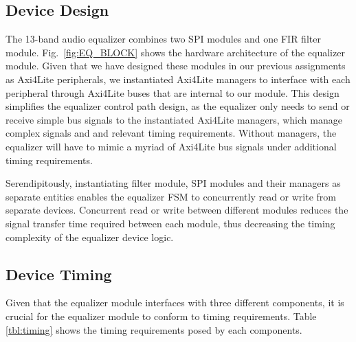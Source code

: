 \documentclass[journal]{IEEEtran} %
\begin{document}
\subsection{Device Design}\label{subsec:dev_design}
The 13-band audio equalizer combines two SPI modules and one FIR filter module. Fig.~\ref{fig:EQ_BLOCK} shows the hardware architecture of the equalizer module. Given that we have designed these modules in our previous assignments as Axi4Lite peripherals, we instantiated Axi4Lite managers to interface with each peripheral through Axi4Lite buses that are internal to our module. This design simplifies the equalizer control path design, as the equalizer only needs to send or receive simple bus signals to the instantiated Axi4Lite managers, which manage complex signals and and relevant timing requirements. Without managers, the equalizer will have to mimic a myriad of Axi4Lite bus signals under additional timing requirements. 

Serendipitously, instantiating filter module, SPI modules and their managers as separate entities enables the equalizer FSM to concurrently read or write from separate devices. Concurrent read or write between different modules reduces the signal transfer time required between each module, thus decreasing the timing complexity of the equalizer device logic.

\subsection{Device Timing}\label{subsec:dev_timing}
Given that the equalizer module interfaces with three different components, it is crucial for the equalizer module to conform to timing requirements. Table \ref{tbl:timing} shows the timing requirements posed by each components.
\end{document}
